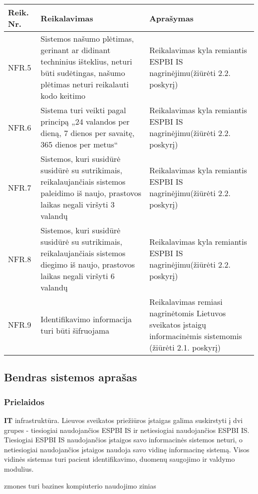 \begin{table}[!ht]
    \centering
    \renewcommand{\arraystretch}{1.2}
    \begin{tabular}{|m{3em}|m{17em}|m{17em}|}
    \hline 
    \rowcolor[HTML]{EFEFEF} 
    Reik. Nr. & Reikalavimas & Aprašymas \\ \hline

    NFR.5  &  Sistemos našumo plėtimas, gerinant ar didinant techninius išteklius, neturi būti sudėtingas, našumo plėtimas neturi reikalauti kodo keitimo  &   Reikalavimas kyla remiantis ESPBI IS nagrinėjimu(žiūrėti 2.2. poskyrį)       \\ \hline
    NFR.6  &   Sistema turi veikti pagal principą „24 valandos per dieną, 7 dienos per savaitę, 365 dienos per metus“  &  Reikalavimas kyla remiantis ESPBI IS nagrinėjimu(žiūrėti 2.2. poskyrį)       \\ \hline
    NFR.7  &  Sistemos, kuri susidūrė susidūrė su sutrikimais, reikalaujančiais sistemos paleidimo iš naujo, prastovos laikas negali viršyti 3 valandų  &   Reikalavimas kyla remiantis ESPBI IS nagrinėjimu(žiūrėti 2.2. poskyrį)       \\ \hline
    NFR.8  &  Sistemos, kuri susidūrė susidūrė su sutrikimais, reikalaujančiais sistemos diegimo iš naujo, prastovos laikas negali viršyti 6 valandų  &   Reikalavimas kyla remiantis ESPBI IS nagrinėjimu(žiūrėti 2.2. poskyrį)       \\ \hline
    NFR.9  &  Identifikavimo informacija turi būti šifruojama  &   Reikalavimas remiasi nagrinėtomis Lietuvos sveikatos įstaigų informacinėmis sistemomis (žiūrėti 2.1. poskyrį)       \\ \hline
    \end{tabular}
\end{table}

\subsection{Bendras sistemos aprašas}
\subsubsection{Prielaidos}
\textbf{IT} infrastruktūra. Lieuvos sveikatos priežiūros įstaigas galima suskirstyti į dvi grupes - tiesiogiai naudojančios ESPBI IS ir netiesiogiai naudojančios ESPBI IS. Tiesiogiai ESPBI IS naudojančios įstaigos savo informacinės sistemos neturi, o netiesiogiai naudojančios įstaigos naudoja savo vidinę informacinę sistemą. Visos vidinės sistemas turi pacient identifikavimo, duomenų saugojimo ir valdymo modulius.

zmones turi bazines kompiuterio naudojimo zinias